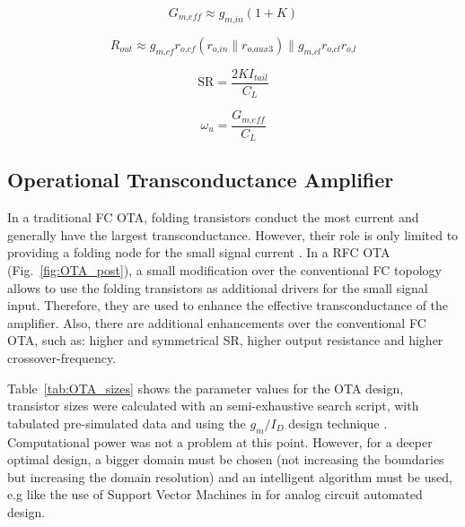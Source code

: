 \begin{equation}
G_\textit{m,eff} \approx g_\textit{m,in}(1+K)
\end{equation}

\begin{equation}
R_\textit{out} \approx g_\textit{m,cf}r_\textit{o,cf}\left(r_\textit{o,in}\parallel r_\textit{o,aux3} \right) \parallel g_\textit{m,cl} r_\textit{o,cl} r_\textit{o,l}
\end{equation}

\begin{equation}
\text{SR} = \frac{2 K I_\textit{tail}}{C_L}
\end{equation}

\begin{equation}
\omega_u = \frac{G_\textit{m,eff}}{C_L}
\end{equation}

\subsection{Operational Transconductance Amplifier}
In a traditional FC OTA, folding transistors conduct the most current and generally have the largest transconductance. However, their role is only limited to providing a folding node for the small signal current \citep{assaad101}. In a RFC OTA (Fig.~\ref{fig:OTA_post}), a small modification over the conventional FC topology allows to use the folding transistors as additional drivers for the small signal input. Therefore, they are used to enhance the effective transconductance of the amplifier. Also, there are additional enhancements over the conventional FC OTA, such as: higher and symmetrical SR, higher output resistance and higher crossover-frequency.


Table~\ref{tab:OTA_sizes} shows the parameter values for the OTA design, transistor sizes were calculated with an semi-exhaustive search script, with tabulated pre-simulated data and using  the $g_m/I_D$ design technique \citep{silveira101}. Computational power was not a problem at this point. However, for a deeper optimal design, a bigger domain must be chosen (not increasing the boundaries but increasing the domain resolution) and an intelligent algorithm must be used, e.g like the use of Support Vector Machines in \citep{bernardinis101} for analog circuit automated design.



